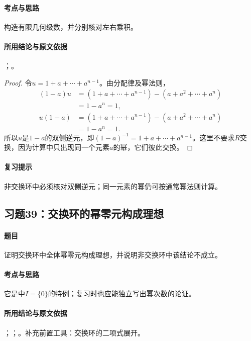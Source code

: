 \paragraph{考点与思路}
构造有限几何级数，并分别核对左右乘积。

\paragraph{所用结论与原文依据}
；。


\begin{proof}
令$u=1+a+\cdots+a^{n-1}$。由分配律及幂法则，
\begin{align*}
(1-a)u&=(1+a+\cdots+a^{n-1})-(a+a^2+\cdots+a^n)\\
&=1-a^n=1,\\
u(1-a)&=(1+a+\cdots+a^{n-1})-(a+a^2+\cdots+a^n)\\
&=1-a^n=1.
\end{align*}
所以$u$是$1-a$的双侧逆元，即$(1-a)^{-1}=1+a+\cdots+a^{n-1}$。这里不要求$R$交换，因为计算中只出现同一个元素$a$的幂，它们彼此交换。
\end{proof}

\paragraph{复习提示}
非交换环中必须核对双侧逆元；同一元素的幂仍可按通常幂法则计算。


\subsection{习题39：\texorpdfstring{交换环的幂零元构成理想}{交换环的幂零元构成理想}}
\label{ex:1:39}

\paragraph{题目}
证明交换环中全体幂零元构成理想，并说明非交换环中该结论不成立。

\paragraph{考点与思路}
它是中$I=\{0\}$的特例；复习时也应能独立写出幂次数的论证。

\paragraph{所用结论与原文依据}
；；。补充前置工具：交换环的二项式展开。

